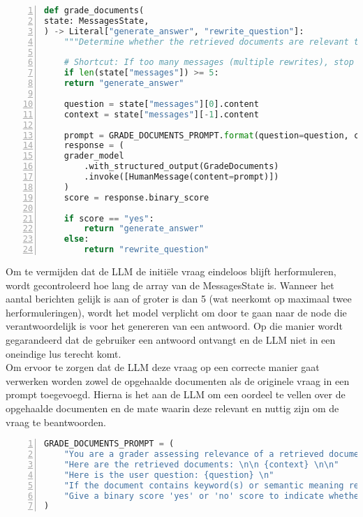 \begin{lstlisting}[basicstyle=\small, frame=single, breaklines=true, postbreak=\mbox{\textcolor{red}{$\hookrightarrow$}\space}, escapeinside ={\%,}, escapechar={!}, numbers=left, language=Python, caption=Functie die beslist tussen antwoord genereren of vraag herschrijven]
def grade_documents(
state: MessagesState,
) -> Literal["generate_answer", "rewrite_question"]:
    """Determine whether the retrieved documents are relevant to the question."""
    
    # Shortcut: If too many messages (multiple rewrites), stop rewriting
    if len(state["messages"]) >= 5:
    return "generate_answer"
    
    question = state["messages"][0].content
    context = state["messages"][-1].content
    
    prompt = GRADE_DOCUMENTS_PROMPT.format(question=question, context=context)
    response = (
    grader_model
        .with_structured_output(GradeDocuments)
        .invoke([HumanMessage(content=prompt)])
    )
    score = response.binary_score
    
    if score == "yes":
        return "generate_answer"
    else:
        return "rewrite_question"
\end{lstlisting}

Om te vermijden dat de LLM de initiële vraag eindeloos blijft herformuleren, wordt gecontroleerd hoe lang de array van de MessagesState is. Wanneer het aantal berichten gelijk is aan of groter is dan 5 (wat neerkomt op maximaal twee herformuleringen), wordt het model verplicht om door te gaan naar de node die verantwoordelijk is voor het genereren van een antwoord. Op die manier wordt gegarandeerd dat de gebruiker een antwoord ontvangt en de LLM niet in een oneindige lus terecht komt.
\\[1em]
Om ervoor te zorgen dat de LLM deze vraag op een correcte manier gaat verwerken worden zowel de opgehaalde documenten als de originele vraag in een prompt toegevoegd. Hierna is het aan de LLM om een oordeel te vellen over de opgehaalde documenten en de mate waarin deze relevant en nuttig zijn om de vraag te beantwoorden.
\begin{lstlisting}[basicstyle=\small, frame=single, breaklines=true, postbreak=\mbox{\textcolor{red}{$\hookrightarrow$}\space}, escapeinside ={\%,}, escapechar={!}, numbers=left, language=Python, caption=Prompt om opgehaalde documenten te beoordelen op basis van de gestelde vraag]
GRADE_DOCUMENTS_PROMPT = (
    "You are a grader assessing relevance of a retrieved document to a user question. \n "
    "Here are the retrieved documents: \n\n {context} \n\n"
    "Here is the user question: {question} \n"
    "If the document contains keyword(s) or semantic meaning related to the user question, grade it as relevant. \n"
    "Give a binary score 'yes' or 'no' score to indicate whether the document is relevant to the question."
)
\end{lstlisting}

